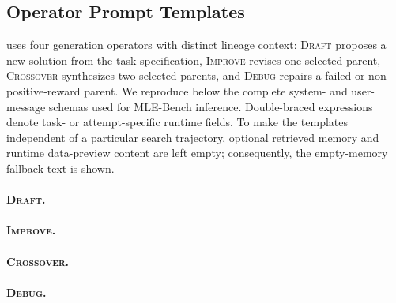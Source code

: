 \subsection{Operator Prompt Templates}
\label{app:openmleevo-operator-prompts}

\openmleevo{} uses four generation operators with distinct lineage context:
\textsc{Draft} proposes a new solution from the task specification,
\textsc{Improve} revises one selected parent, \textsc{Crossover} synthesizes two
selected parents, and \textsc{Debug} repairs a failed or non-positive-reward
parent. We reproduce below the complete system- and user-message schemas used
for MLE-Bench inference. Double-braced expressions denote task- or
attempt-specific runtime fields. To make the templates independent of a
particular search trajectory, optional retrieved memory and runtime data-preview
content are left empty; consequently, the empty-memory fallback text is shown.

\paragraph{\textsc{Draft}.}

\paragraph{\textsc{Improve}.}

\paragraph{\textsc{Crossover}.}

\paragraph{\textsc{Debug}.}



